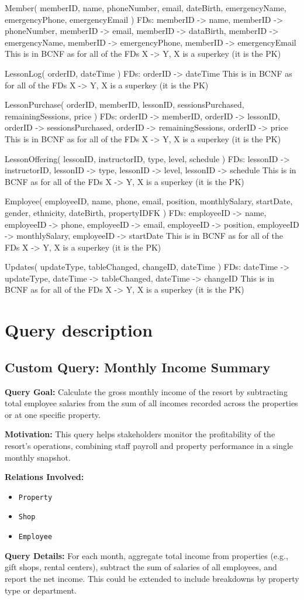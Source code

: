 \documentclass[11pt]{scrartcl}
\begin{document}
Member( memberID, name, phoneNumber, email, dateBirth, emergencyName, emergencyPhone, emergencyEmail )
FDs: memberID -> name, memberID -> phoneNumber, memberID -> email, memberID -> dataBirth,
     memberID -> emergencyName, memberID -> emergencyPhone, memberID -> emergencyEmail
This is in BCNF as for all of the FDs X -> Y, X is a superkey (it is the PK)

LessonLog( orderID, dateTime )
FDs: orderID -> dateTime
This is in BCNF as for all of the FDs X -> Y, X is a superkey (it is the PK)

LessonPurchase( orderID, memberID, lessonID, sessionsPurchased, remainingSessions, price )
FDs: orderID -> memberID, orderID -> lessonID, orderID -> sessionsPurchased, orderID -> remainingSessions,
     orderID -> price
This is in BCNF as for all of the FDs X -> Y, X is a superkey (it is the PK)

LessonOffering( lessonID, instructorID, type, level, schedule )
FDs: lessonID -> instructorID, lessonID -> type, lessonID -> level, lessonID -> schedule
This is in BCNF as for all of the FDs X -> Y, X is a superkey (it is the PK)

Employee( employeeID, name, phone, email, position, monthlySalary, startDate,
gender, ethnicity, dateBirth, propertyIDFK )
FDs: employeeID -> name, employeeID -> phone, employeeID -> email, employeeID -> position,
     employeeID -> monthlySalary, employeeID -> startDate
This is in BCNF as for all of the FDs X -> Y, X is a superkey (it is the PK)

Updates( updateType, tableChanged, changeID, dateTime )
FDs: dateTime -> updateType, dateTime -> tableChanged, dateTime -> changeID
This is in BCNF as for all of the FDs X -> Y, X is a superkey (it is the PK)

\section{Query description}
\subsection{Custom Query: Monthly Income Summary}

\textbf{Query Goal:} Calculate the gross monthly income of the resort by subtracting total employee salaries from the sum of all incomes recorded across the properties or at one specific property.

\textbf{Motivation:} This query helps stakeholders monitor the profitability of the resort’s operations, combining staff payroll and property performance in a single monthly snapshot.

\textbf{Relations Involved:}
\begin{itemize}
  \item \texttt{Property}
  \item \texttt{Shop}
  \item \texttt{Employee}
\end{itemize}

\textbf{Query Details:} For each month, aggregate total income from properties (e.g., gift shops, rental centers), subtract the sum of salaries of all employees, and report the net income. This could be extended to include breakdowns by property type or department.
\end{document}
